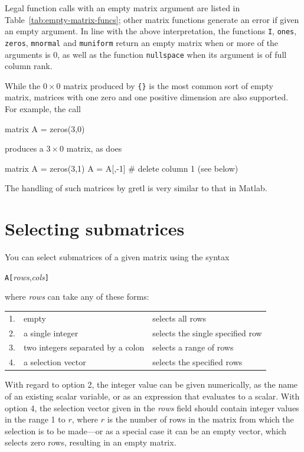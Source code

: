 Legal function calls with an empty matrix argument are listed in
Table~\ref{tab:empty-matrix-funcs}; other matrix functions generate an
error if given an empty argument.  In line with the above
interpretation, the functions \texttt{I}, \texttt{ones},
\texttt{zeros}, \texttt{mnormal} and \texttt{muniform} return an empty
matrix when or more of the arguments is 0, as well as the function
\texttt{nullspace} when its argument is of full column rank.

While the $0 \times 0$ matrix produced by \verb|{}| is the most common
sort of empty matrix, matrices with one zero and one positive
dimension are also supported. For example, the call
\begin{code}
  matrix A = zeros(3,0)
\end{code}
produces a $3 \times 0$ matrix, as does
\begin{code}
matrix A = zeros(3,1)
A = A[,-1] # delete column 1 (see below)
\end{code}
The handling of such matrices by gretl is very similar to that in
\textsf{Matlab}.

\section{Selecting submatrices}
\label{sec:matrix-sub}

You can select submatrices of a given matrix using the syntax

\hspace{1em} \texttt{A[}\textsl{rows},\textsl{cols}\texttt{]}

where \textsl{rows} can take any of these forms:

\begin{center}
\begin{tabular}{lll}
1. & empty & selects all rows \\
2. & a single integer & selects the single specified row \\
3. & two integers separated by a colon & selects a range of rows \\
4. & a selection vector & selects the specified rows \\
\end{tabular}
\end{center}

With regard to option 2, the integer value can be given numerically, as
the name of an existing scalar variable, or as an expression that
evaluates to a scalar.  With option 4, the selection vector given in the
\textsl{rows} field should contain integer values in the range 1 to $r$,
where $r$ is the number of rows in the matrix from which the selection
is to be made---or as a special case it can be an empty vector, which
selects zero rows, resulting in an empty matrix.

